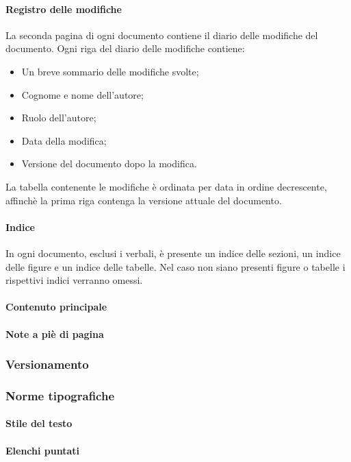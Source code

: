 		\paragraph{Registro delle modifiche}
		La seconda pagina di ogni documento contiene il diario delle modifiche del documento.
		Ogni riga del diario delle modifiche contiene:
		\begin{itemize}
			\item Un breve sommario delle modifiche svolte;
			\item Cognome e nome dell’autore;
			\item Ruolo dell’autore;
			\item Data della modifica;
			\item Versione del documento dopo la modifica.
		\end{itemize}
		La tabella contenente le modifiche è ordinata per data in ordine decrescente, affinchè la prima riga contenga la versione attuale del documento.
		
		\paragraph{Indice}
		In ogni documento, esclusi i verbali, è presente un indice delle sezioni, un indice delle figure e un indice delle tabelle. Nel caso non siano presenti figure o tabelle i rispettivi indici verranno omessi.
		
		\paragraph{Contenuto principale}
		\paragraph{Note a piè di pagina}
	\subsubsection{Versionamento}
	\subsubsection{Norme tipografiche}
		\paragraph{Stile del testo}
		\paragraph{Elenchi puntati}

